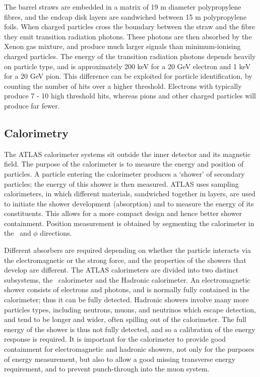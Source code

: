 The barrel straws are embedded in a matrix of 19 \micro m diameter polypropylene
fibres, and the endcap disk layers are sandwiched between 15 \micro m
polypropylene foils. When charged particles cross the boundary between the straw
and the fibre they emit
transition radiation photons. These photons are then absorbed by the Xenon gas
mixture, and produce much larger signals than minimum-ionising
charged particles. The energy of the transition radiation photons depends
heavily on particle type, and is approximately 200 keV for a 20 GeV electron and
1 keV for a 20 GeV pion. This difference can be exploited for particle
identification, by counting the number of hits over a higher threshold.
Electrons with  typically produce 7 - 10 high threshold hits, whereas
pions and other charged particles will produce far fewer.

\subsection{Calorimetry}

The ATLAS
calorimeter systems sit outside the inner detector and its magnetic field. 
The purpose of the calorimeter is to measure the energy and
position of particles. A particle entering the calorimeter produces a
`shower' of secondary particles; the energy of this shower is then measured.
ATLAS uses sampling calorimeters, in which different materials, sandwiched
together in layers, are used to initiate the shower development (absorption) and
to measure the energy of its constituents. This
allows for a more compact design and hence better shower containment. Position
measurement is obtained by segmenting the calorimeter in the \z\ and $\phi$
directions.

Different absorbers are required depending on whether the particle interacts
via the electromagnetic or the strong force, and the properties of the showers that develop
are different. The ATLAS calorimeters are divided into two distinct subsystems,
the \emag\ calorimeter and the Hadronic calorimeter. An electromagnetic
shower consists of electrons and photons, and is normally fully contained in the
calorimeter; thus it can be fully detected. Hadronic showers involve many more
particles types, including neutrons, muons, and neutrinos which escape detection, and tend
to be longer and wider, often spilling out of the calorimeter. The full energy
of the shower is thus not fully detected, and so a calibration of the energy
response is required. It is important for the calorimeter to provide good
containment for electromagnetic and hadronic showers, not only for the purposes
of energy measurement, but also to allow a good missing transverse energy
requirement, and to prevent punch-through into the muon system.

